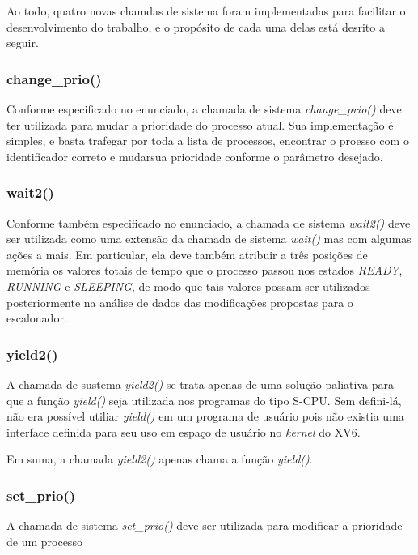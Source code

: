 \documentclass{article}
\begin{document}
Ao todo, quatro novas chamdas de sistema foram implementadas para facilitar o
desenvolvimento do trabalho, e o propósito de cada uma delas está desrito a
seguir.

\subsubsection{change\_prio()}

Conforme especificado no enunciado, a chamada de sistema
\textit{change\_prio()} deve ter utilizada para mudar
a prioridade do processo atual. Sua implementação é simples, e basta trafegar
por toda a lista de processos, encontrar o proesso com o identificador correto
e mudarsua prioridade conforme o parâmetro desejado.

\subsubsection{wait2()}

Conforme também especificado no enunciado, a chamada de sistema
\textit{wait2()} deve ser utilizada como uma
extensão da chamada de sistema \textit{wait()} mas com algumas ações a mais. Em
particular, ela deve também atribuir a três posições de memória os valores
totais de tempo que o processo passou nos estados \textit{READY},
\textit{RUNNING} e \textit{SLEEPING}, de modo que tais valores possam ser
utilizados posteriormente na análise de dados das modificações propostas para o
escalonador.

\subsubsection{yield2()}

A chamada de sustema \textit{yield2()} se trata apenas de uma solução paliativa
para que a função \textit{yield()} seja utilizada
nos programas do tipo S-CPU. Sem defini-lá, não era possível utiliar
\textit{yield()} em um programa de usuário pois não existia uma interface
definida para seu uso em espaço de usuário no \textit{kernel} do XV6.

Em suma, a chamada \textit{yield2()} apenas chama a função \textit{yield()}.

\subsubsection{set\_prio()}

A chamada de sistema \textit{set\_prio()} deve ser utilizada para modificar a prioridade de um processo
\end{document}
